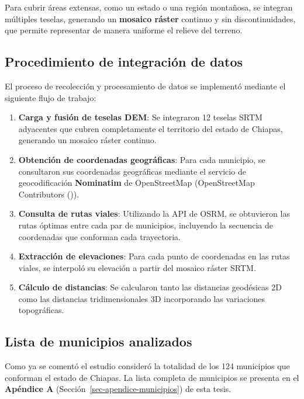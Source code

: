 \documentclass[
  spanish,
  us-letterpaper,
]{scrreprt}
\numberwithin{equation}{section}
\begin{document}
Para cubrir áreas extensas, como un estado o una región montañosa, se
integran múltiples teselas, generando un \textbf{mosaico ráster}
continuo y sin discontinuidades, que permite representar de manera
uniforme el relieve del terreno.

\subsection{Procedimiento de integración de datos}\label{sec-nominatim2}

El proceso de recolección y procesamiento de datos se implementó
mediante el siguiente flujo de trabajo:

\begin{enumerate}
\def\labelenumi{\arabic{enumi}.}
\item
  \textbf{Carga y fusión de teselas DEM}: Se integraron 12 teselas SRTM
  adyacentes que cubren completamente el territorio del estado de
  Chiapas, generando un mosaico ráster continuo.
\item
  \textbf{Obtención de coordenadas geográficas}: Para cada municipio, se
  consultaron sus coordenadas geográficas mediante el servicio de
  geocodificación \textbf{Nominatim} de OpenStreetMap (OpenStreetMap
  Contributors ()).
\item
  \textbf{Consulta de rutas viales}: Utilizando la API de OSRM, se
  obtuvieron las rutas óptimas entre cada par de municipios, incluyendo
  la secuencia de coordenadas que conforman cada trayectoria.
\item
  \textbf{Extracción de elevaciones}: Para cada punto de coordenadas en
  las rutas viales, se interpoló su elevación a partir del mosaico
  ráster SRTM.
\item
  \textbf{Cálculo de distancias}: Se calcularon tanto las distancias
  geodésicas 2D como las distancias tridimensionales 3D incorporando las
  variaciones topográficas.
\end{enumerate}

\subsection{Lista de municipios
analizados}\label{lista-de-municipios-analizados}

Como ya se comentó el estudio consideró la totalidad de los 124
municipios que conforman el estado de Chiapas. La lista completa de
municipios se presenta en el \textbf{Apéndice A}
(Sección~\ref{sec-apendice-municipios}) de esta tesis.
\end{document}

